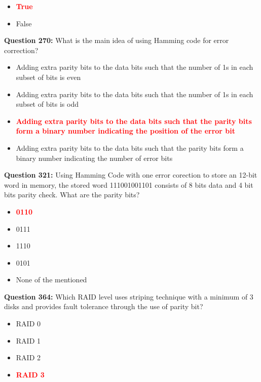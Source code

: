 \documentclass[12pt,a4paper]{article}
\begin{document}
\begin{itemize}
    \item[\textbf{A.}] \textcolor{red}{\textbf{True}}
    \item[\textbf{B.}] False
\end{itemize}

\vspace{0.5cm}

\textbf{Question 270:} What is the main idea of using Hamming code for error correction?

\begin{itemize}
    \item[\textbf{A.}] Adding extra parity bits to the data bits such that the number of 1s in each subset of bits is even
    \item[\textbf{B.}] Adding extra parity bits to the data bits such that the number of 1s in each subset of bits is odd
    \item[\textbf{C.}] \textcolor{red}{\textbf{Adding extra parity bits to the data bits such that the parity bits form a binary number indicating the position of the error bit}}
    \item[\textbf{D.}] Adding extra parity bits to the data bits such that the parity bits form a binary number indicating the number of error bits
\end{itemize}

\vspace{0.5cm}

\textbf{Question 321:} Using Hamming Code with one error corection to store an 12-bit word in memory, the stored word 111001001101 consists of 8 bits data and 4 bit bits parity check. What are the parity bits?

\begin{itemize}
    \item[\textbf{A.}] \textcolor{red}{\textbf{0110}}
    \item[\textbf{B.}] 0111
    \item[\textbf{C.}] 1110
    \item[\textbf{D.}] 0101
    \item[\textbf{E.}] None of the mentioned
\end{itemize}

\vspace{0.5cm}

\textbf{Question 364:} Which RAID level uses striping technique with a minimum of 3 disks and provides fault tolerance through the use of parity bit?

\begin{itemize}
    \item[\textbf{A.}] RAID 0
    \item[\textbf{B.}] RAID 1
    \item[\textbf{C.}] RAID 2
    \item[\textbf{D.}] \textcolor{red}{\textbf{RAID 3}}
\end{itemize}
\end{document}

